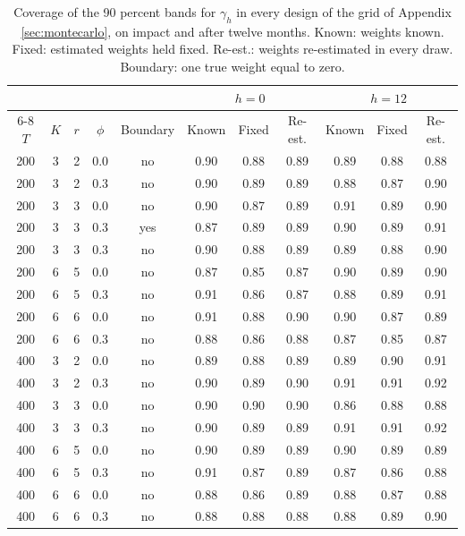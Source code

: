 \begin{table}[H]
\centering\small
\caption{Coverage of the 90 percent bands for $\gamma_h$ in every design of the grid of Appendix \ref{sec:montecarlo}, on impact and after twelve months. Known: weights known. Fixed: estimated weights held fixed. Re-est.: weights re-estimated in every draw. Boundary: one true weight equal to zero.\label{tab:mc-grid}}
\begin{tabular}{ccccc ccc ccc}
\toprule
 & & & & & \multicolumn{3}{c}{$h=0$} & \multicolumn{3}{c}{$h=12$}\\
\cmidrule{6-8}\cmidrule{9-11}
$T$ & $K$ & $r$ & $\phi$ & Boundary & Known & Fixed & Re-est. & Known & Fixed & Re-est.\\
\midrule
200 & 3 & 2 & 0.0 & no & 0.90 & 0.88 & 0.89 & 0.89 & 0.88 & 0.88\\
200 & 3 & 2 & 0.3 & no & 0.90 & 0.89 & 0.89 & 0.88 & 0.87 & 0.90\\
200 & 3 & 3 & 0.0 & no & 0.90 & 0.87 & 0.89 & 0.91 & 0.89 & 0.90\\
200 & 3 & 3 & 0.3 & yes & 0.87 & 0.89 & 0.89 & 0.90 & 0.89 & 0.91\\
200 & 3 & 3 & 0.3 & no & 0.90 & 0.88 & 0.89 & 0.89 & 0.88 & 0.90\\
200 & 6 & 5 & 0.0 & no & 0.87 & 0.85 & 0.87 & 0.90 & 0.89 & 0.90\\
200 & 6 & 5 & 0.3 & no & 0.91 & 0.86 & 0.87 & 0.88 & 0.89 & 0.91\\
200 & 6 & 6 & 0.0 & no & 0.91 & 0.88 & 0.90 & 0.90 & 0.87 & 0.89\\
200 & 6 & 6 & 0.3 & no & 0.88 & 0.86 & 0.88 & 0.87 & 0.85 & 0.87\\
400 & 3 & 2 & 0.0 & no & 0.89 & 0.88 & 0.89 & 0.89 & 0.90 & 0.91\\
400 & 3 & 2 & 0.3 & no & 0.90 & 0.89 & 0.90 & 0.91 & 0.91 & 0.92\\
400 & 3 & 3 & 0.0 & no & 0.90 & 0.90 & 0.90 & 0.86 & 0.88 & 0.88\\
400 & 3 & 3 & 0.3 & no & 0.90 & 0.89 & 0.89 & 0.91 & 0.91 & 0.92\\
400 & 6 & 5 & 0.0 & no & 0.90 & 0.89 & 0.89 & 0.90 & 0.89 & 0.89\\
400 & 6 & 5 & 0.3 & no & 0.91 & 0.87 & 0.89 & 0.87 & 0.86 & 0.88\\
400 & 6 & 6 & 0.0 & no & 0.88 & 0.86 & 0.89 & 0.88 & 0.87 & 0.88\\
400 & 6 & 6 & 0.3 & no & 0.88 & 0.88 & 0.88 & 0.88 & 0.89 & 0.90\\
\bottomrule
\end{tabular}
\end{table}
